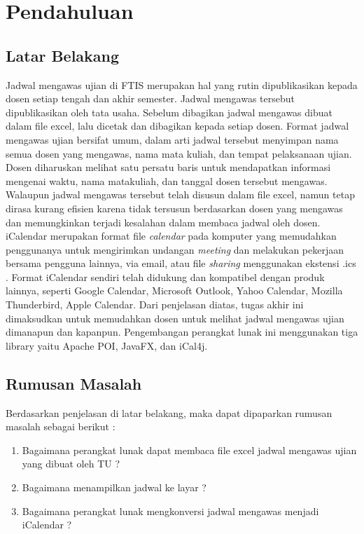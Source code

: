 \chapter{Pendahuluan}
\label{chap:intro}
   
\section{Latar Belakang}
\label{sec:latar_belakang}
\indent Jadwal mengawas ujian di FTIS merupakan hal yang rutin dipublikasikan kepada dosen setiap tengah dan akhir semester. Jadwal mengawas tersebut dipublikasikan oleh tata usaha. Sebelum dibagikan jadwal mengawas dibuat dalam file excel, lalu dicetak dan dibagikan kepada setiap dosen. Format jadwal mengawas ujian bersifat umum, dalam arti jadwal tersebut menyimpan nama semua dosen yang mengawas, nama mata kuliah, dan tempat pelaksanaan ujian. Dosen diharuskan melihat satu persatu baris untuk mendapatkan informasi mengenai waktu, nama matakuliah, dan tanggal dosen tersebut mengawas. Walaupun jadwal mengawas tersebut telah disusun dalam file excel, namun tetap dirasa kurang efisien karena tidak tersusun berdasarkan dosen yang mengawas dan memungkinkan terjadi kesalahan dalam membaca jadwal oleh dosen. 
iCalendar merupakan format file \textit{calendar} pada komputer yang memudahkan penggunanya untuk mengirimkan undangan \textit{meeting} dan melakukan pekerjaan bersama pengguna lainnya, via email, atau file \textit{sharing} menggunakan ekstensi .ics . Format iCalendar sendiri telah didukung dan kompatibel dengan produk lainnya, seperti Google Calendar, Microsoft Outlook, Yahoo Calendar, Mozilla Thunderbird, Apple Calendar.
Dari penjelasan diatas, tugas akhir ini dimaksudkan untuk memudahkan dosen untuk melihat jadwal mengawas ujian dimanapun dan kapanpun. Pengembangan perangkat lunak ini menggunakan tiga library yaitu Apache POI, JavaFX, dan iCal4j.    

\section{Rumusan Masalah}
\label{sec:rumusan}
Berdasarkan penjelasan di latar belakang, maka dapat dipaparkan rumusan masalah sebagai berikut :
\begin{enumerate}
	\item Bagaimana perangkat lunak dapat membaca file excel jadwal mengawas ujian yang dibuat oleh TU ?
	\item Bagaimana menampilkan jadwal ke layar ?
	\item Bagaimana perangkat lunak mengkonversi jadwal mengawas menjadi iCalendar ? 
\end{enumerate}


